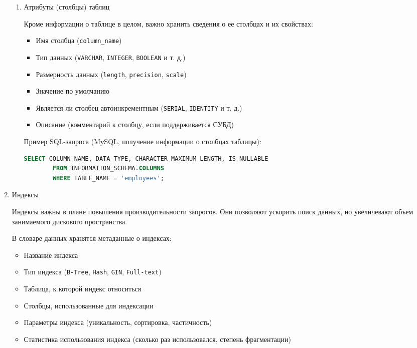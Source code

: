 \begin{enumerate}
\begin{enumerate}
        \item Атрибуты (столбцы) таблиц
    
        Кроме информации о таблице в целом, важно хранить сведения о ее столбцах и их свойствах:
        
        \begin{itemize}
            \item Имя столбца (\texttt{column\_name})
            \item Тип данных (\texttt{VARCHAR}, \texttt{INTEGER}, \texttt{BOOLEAN} и т. д.)
            \item Размерность данных (\texttt{length}, \texttt{precision}, \texttt{scale})
            \item Значение по умолчанию
            \item Является ли столбец автоинкрементным (\texttt{SERIAL}, \texttt{IDENTITY} и т. д.)
            \item Описание (комментарий к столбцу, если поддерживается СУБД)
        \end{itemize}

        Пример SQL-запроса (MySQL, получение информации о столбцах таблицы):
        \begin{lstlisting}[language=SQL]
        SELECT COLUMN_NAME, DATA_TYPE, CHARACTER_MAXIMUM_LENGTH, IS_NULLABLE 
        FROM INFORMATION_SCHEMA.COLUMNS 
        WHERE TABLE_NAME = 'employees';
        \end{lstlisting}
    \end{enumerate}
    
    \item Индексы \autocites[§51.26]{PostgreSQLdocc51}[§52.11]{PostgreSQLdocc52}[§28.3.34]{Mysqldoc1}{MicrosoftLearnSQLserverInd}

    Индексы важны в плане повышения производительности запросов. Они позволяют ускорить поиск данных, но увеличевают объем занимаемого дискового пространства.

    В словаре данных хранятся метаданные о индексах:
    \begin{itemize}
        \item Название индекса
        \item Тип индекса (\texttt{B-Tree}, \texttt{Hash}, \texttt{GIN}, \texttt{Full-text})
        \item Таблица, к которой индекс относиться
        \item Столбцы, использованные для индексации
        \item Параметры индекса (уникальность, сортировка, частичность)
        \item Статистика использования индекса (сколько раз использовался, степень фрагментации)
    \end{itemize}


\end{enumerate}
